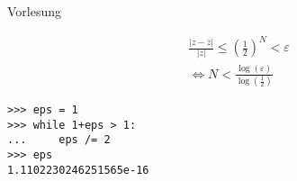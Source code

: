 Vorlesung

\begin{align*}
&\frac{|z - \overline{z}|}{|z|} \leq \left( \frac{1}{2}\right)^N < \varepsilon \\
& \Leftrightarrow N < \frac{\log(\varepsilon)}{\log(\frac{1}{2})}
\end{align*}

\begin{verbatim}
>>> eps = 1
>>> while 1+eps > 1:
...     eps /= 2
>>> eps
1.1102230246251565e-16
\end{verbatim}